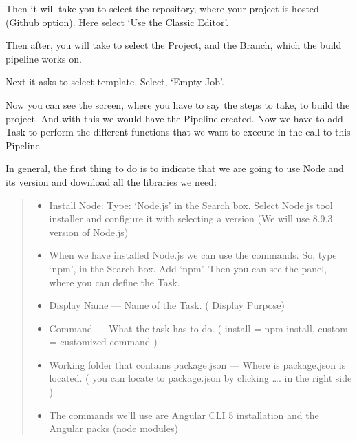\documentclass[letterpaper,10pt,english]{sphinxmanual}
\begin{document}
Then it will take you to select the repository, where your project is hosted (Github option). Here select ‘Use the Classic Editor’.



Then after, you will take to select the Project, and the Branch, which the build pipeline works on.

Next it asks to select template. Select, ‘Empty Job’.

Now you can see the screen, where you have to say the steps to take, to build the project. And with this we would have the Pipeline created. Now we have to add Task to perform the different functions that we want to execute in the call to this Pipeline.

In general, the first thing to do is to indicate that we are going to use Node and its version and download all the libraries we need:
\begin{quote}
\begin{itemize}
\item {} 
Install Node: Type: ‘Node.js’ in the Search box. Select Node.js tool installer and configure it with selecting a version (We will use 8.9.3 version of Node.js)

\item {} 
When we have installed Node.js we can use the commands. So, type ‘npm’, in the Search box. Add ‘npm’. Then you can see the panel, where you can define the Task.

\end{itemize}
\begin{itemize}
\item {} 
Display Name — Name of the Task. ( Display Purpose)

\item {} 
Command — What the task has to do. ( install = npm install, custom = customized command )

\item {} 
Working folder that contains package.json — Where is package.json is located. ( you can locate to package.json by clicking …. in the right side )

\end{itemize}
\begin{itemize}
\item {} 
The commands we’ll use are Angular CLI 5 installation and the Angular packs (node modules)

\end{itemize}
\end{quote}
\end{document}
